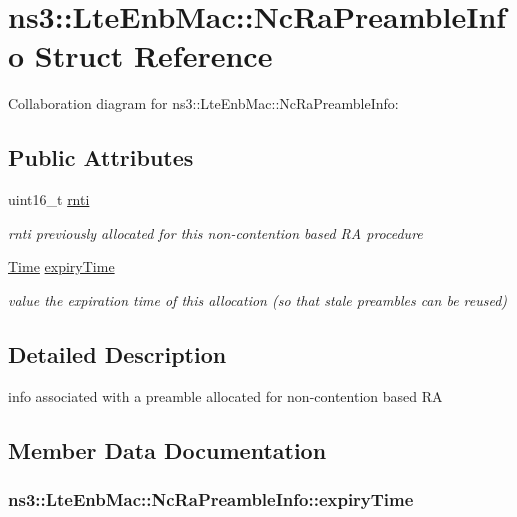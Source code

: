 \hypertarget{structns3_1_1LteEnbMac_1_1NcRaPreambleInfo}{}\section{ns3\+:\+:Lte\+Enb\+Mac\+:\+:Nc\+Ra\+Preamble\+Info Struct Reference}
\label{structns3_1_1LteEnbMac_1_1NcRaPreambleInfo}


Collaboration diagram for ns3\+:\+:Lte\+Enb\+Mac\+:\+:Nc\+Ra\+Preamble\+Info\+:
\subsection*{Public Attributes}
\begin{DoxyCompactItemize}
\item 
uint16\+\_\+t \hyperlink{structns3_1_1LteEnbMac_1_1NcRaPreambleInfo_acf410fae42e15f28e1b9714d4c7ba462}{rnti}
\begin{DoxyCompactList}\small\item\em rnti previously allocated for this non-\/contention based RA procedure \end{DoxyCompactList}\item 
\hyperlink{classns3_1_1Time}{Time} \hyperlink{structns3_1_1LteEnbMac_1_1NcRaPreambleInfo_a219d8f73f1af1d40f08d3574ddb60a67}{expiry\+Time}
\begin{DoxyCompactList}\small\item\em value the expiration time of this allocation (so that stale preambles can be reused) \end{DoxyCompactList}\end{DoxyCompactItemize}


\subsection{Detailed Description}
info associated with a preamble allocated for non-\/contention based RA 

\subsection{Member Data Documentation}
\subsubsection[{\texorpdfstring{expiry\+Time}{expiryTime}}]{ ns3\+::\+Lte\+Enb\+Mac\+::\+Nc\+Ra\+Preamble\+Info\+::expiry\+Time}\hypertarget{structns3_1_1LteEnbMac_1_1NcRaPreambleInfo_a219d8f73f1af1d40f08d3574ddb60a67}{}\label{structns3_1_1LteEnbMac_1_1NcRaPreambleInfo_a219d8f73f1af1d40f08d3574ddb60a67}


